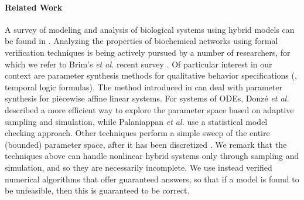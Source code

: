 
\paragraph{Related Work}
A survey of modeling and analysis of biological systems using hybrid models can be found in \cite{luca08}.
Analyzing the properties of biochemical networks using formal verification techniques is being actively
pursued by a number of researchers, for which we refer to Brim's {\em et al.} recent 
survey \cite{BrimSFM13}.
Of particular interest in our context are parameter synthesis methods for qualitative behavior 
specifications (\eg, temporal logic formulas). The method introduced in \cite{rovergene} can deal 
with parameter synthesis for piecewise affine linear systems. For systems of ODEs, 
Donz\'{e} {\em et al.}~\cite{donze}
described a more efficient way to explore the parameter space based on adaptive sampling and simulation,
while Palaniappan {\em et al.} \cite{liu13} use a statistical model checking approach. Other techniques
perform a simple sweep of the entire (bounded) parameter space, after it has been 
discretized \cite{Calzone06,Donaldson08}. We remark that the techniques above can handle nonlinear
hybrid systems only through sampling and simulation, and so they are necessarily incomplete. 
We use instead verified numerical algorithms that offer guaranteed answers, so that
if a model is found to be unfeasible, then this is guaranteed to be correct.


